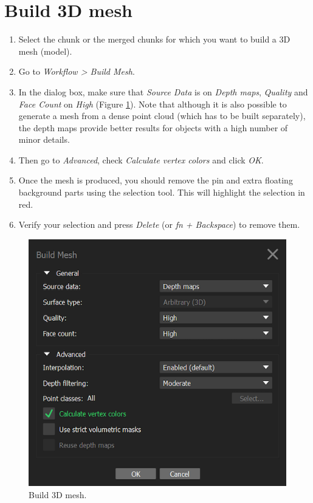 \documentclass[
]{book}
\begin{document}
\hypertarget{build-3d-mesh}{%
\section{Build 3D mesh}\label{build-3d-mesh}}

\begin{enumerate}
\def\labelenumi{\arabic{enumi}.}
\item
  Select the chunk or the merged chunks for which you want to build a
  3D mesh (model).
\item
  Go to \emph{Workflow \textgreater{} Build Mesh}.
\item
  In the dialog box, make sure that \emph{Source Data} is on \emph{Depth maps},
  \emph{Quality} and \emph{Face Count} on \emph{High} (Figure \ref{fig:build3Dmesh}).
  Note that although it is also possible to generate a mesh from a
  dense point cloud (which has to be built separately), the depth maps
  provide better results for objects with a high number of minor
  details.
\item
  Then go to \emph{Advanced}, check \emph{Calculate vertex colors} and click \emph{OK}.
\item
  Once the mesh is produced, you should remove the pin and extra
  floating background parts using the selection tool. This will
  highlight the selection in red.
\item
  Verify your selection and press \emph{Delete} (or \emph{fn + Backspace}) to remove them.
\end{enumerate}

\begin{figure}

{\centering \includegraphics[width=0.5\linewidth]{Figures/metashape_build_mesh} 

}

\caption{Build 3D mesh.}\label{fig:build3Dmesh}
\end{figure}
\end{document}
